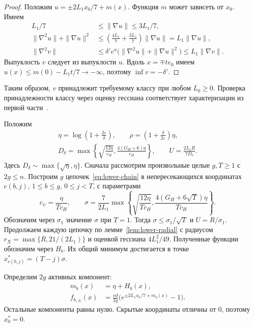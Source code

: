 \begin{proof}
Положим $u=\pm2L_1x_0/7+m(x)$. Функция $m$ может зависеть от $x_0$.
Имеем
\begin{equation}\label{eq:lower-lift}
 \begin{aligned}
 L_1/7&\le\|\nabla u\|\le3L_1/7,\\
 \|\nabla^2u\|+\|\nabla u\|^2
 &\le\left(\frac{4L_1}{7}+\frac{3L_1}{7}\right)\|\nabla u\|
 =L_1\|\nabla u\|,\\
 \|\nabla^2v\|
 &\le\delta'e^u\bigl(\|\nabla^2u\|+\|\nabla u\|^2\bigr)
 \le L_1\|\nabla v\|.
 \end{aligned}
\end{equation}
Выпуклость $v$ следует из выпуклости $u$.
Вдоль $x=\mp te_0$ имеем $u(x)\le m(0)-L_1t/7\to-\infty$,
поэтому $\inf v=-\delta'$.
\end{proof}

Таким образом, $v$ принадлежит требуемому классу при любом $L_0\ge0$.
Проверка принадлежности классу через оценку гессиана соответствует характеризации
из первой части~\citep[лемма~2.2]{rudomanov2026everest}.

Положим
\begin{equation}\label{eq:lower-X-parameters}
 \begin{gathered}
 \eta=\log\left(1+\frac{2\varepsilon}{\delta}\right),\qquad
 \rho=\left(1+\frac{\delta}{2\varepsilon}\right)\eta,\\
 D_\delta=\max\left\{\sqrt{\frac{12\eta}{c_H}},
                   \frac{4(G_H+6)\eta}{c_H}\right\},
 \qquad U=\frac{2L_1R}{7D_\delta}.
 \end{gathered}
\end{equation}
Здесь $D_\delta\sim\max\{\sqrt\eta,\eta\}$.
Сначала рассмотрим произвольные целые $g,T\ge1$ с $2g\le n$.
Построим $g$ цепочек~\eqref{eq:lower-chain} в непересекающихся координатах
$c(b,j)$, $1\le b\le g$, $0\le j<T$, с параметрами
\[
 c_\psi=\frac{\eta}{Tc_H},\qquad
 \sigma=\frac7{2L_1}\max\left\{
 \sqrt{\frac{12\eta}{Tc_H}},\frac{4(G_H+6\sqrt T)\eta}{Tc_H}\right\}.
\]
Обозначим через $\sigma_1$ значение $\sigma$ при $T=1$.
Тогда $\sigma\le\sigma_1/\sqrt T$ и $U=R/\sigma_1$.
Продолжаем каждую цепочку по лемме~\ref{lem:lower-radial}
с радиусом $r_X=\max\{R,21/(2L_1)\}$ и оценкой гессиана $4L_1^2/49$.
Полученные функции обозначим через $H_b$.
Их общий минимум достигается в точке
$x^\ast_{c(b,j)}=(T-j)\sigma$.

Определим $2g$ активных компонент:
\[
 \begin{aligned}
 m_b(x)&=\eta+H_b(x),\\
 f_{b,\pm}(x)&=\frac{n\delta}{2g}
 \bigl(e^{\pm2L_1x_0/7+m_b(x)}-1\bigr).
 \end{aligned}
\]
Остальные компоненты равны нулю. Скрытые координаты отличны от $0$,
поэтому $x^\ast_0=0$.

